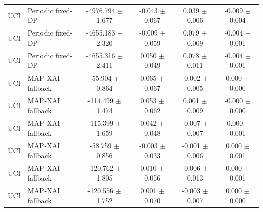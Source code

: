 \begin{tabular}{llcccc}
UCI & Periodic fixed-DP & -4976.794 $\pm$ 1.677 & -0.043 $\pm$ 0.067 & 0.039 $\pm$ 0.006 & -0.009 $\pm$ 0.004 \\
UCI & Periodic fixed-DP & -4655.183 $\pm$ 2.320 & -0.009 $\pm$ 0.059 & 0.079 $\pm$ 0.009 & -0.004 $\pm$ 0.001 \\
UCI & Periodic fixed-DP & -4655.316 $\pm$ 2.411 & 0.050 $\pm$ 0.049 & 0.078 $\pm$ 0.011 & -0.004 $\pm$ 0.001 \\
UCI & MAP-XAI fallback & -55.904 $\pm$ 0.864 & 0.065 $\pm$ 0.067 & -0.002 $\pm$ 0.005 & 0.000 $\pm$ 0.000 \\
UCI & MAP-XAI fallback & -114.499 $\pm$ 1.474 & 0.053 $\pm$ 0.062 & 0.001 $\pm$ 0.009 & -0.000 $\pm$ 0.000 \\
UCI & MAP-XAI fallback & -115.399 $\pm$ 1.659 & 0.042 $\pm$ 0.048 & -0.007 $\pm$ 0.007 & -0.000 $\pm$ 0.001 \\
UCI & MAP-XAI fallback & -58.759 $\pm$ 0.856 & -0.003 $\pm$ 0.033 & -0.001 $\pm$ 0.006 & 0.000 $\pm$ 0.001 \\
UCI & MAP-XAI fallback & -120.762 $\pm$ 1.805 & 0.010 $\pm$ 0.056 & -0.006 $\pm$ 0.013 & 0.000 $\pm$ 0.001 \\
UCI & MAP-XAI fallback & -120.556 $\pm$ 1.752 & 0.001 $\pm$ 0.070 & -0.003 $\pm$ 0.007 & 0.000 $\pm$ 0.000 \\
\bottomrule
\end{tabular}
